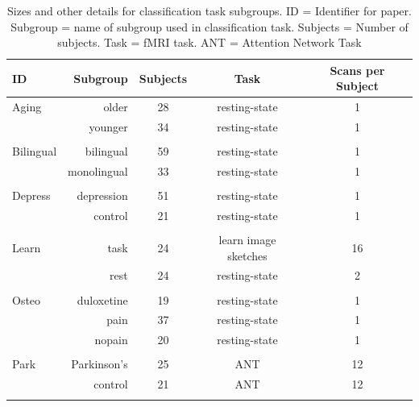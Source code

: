 \documentclass[12pt]{spieman}  %
\begin{document}
\begin{spacing}{2}
\begin{table}[h!]
\caption{
    \label{tab:data-subjects}
    Sizes and other details for classification task subgroups.
    ID = Identifier for paper. Subgroup = name of subgroup used in classification task. Subjects = Number of subjects.
    Task = fMRI task. ANT = Attention Network Task \cite{fanActivationAttentionalNetworks2005}
}
\small
\centering
\begin{tabular}{ l r c c c }
\hline
\textbf{ID}  & \textbf{Subgroup}  & \textbf{Subjects}  & \textbf{Task} & \textbf{Scans per Subject} \\
\hline
Aging   &  older             & 28      & resting-state        & 1 \\
        &  younger           & 34      & resting-state        & 1 \\
        &                    &         &                      &   \\
Bilingual  &  bilingual          & 59      & resting-state    & 1 \\
        &  monolingual        & 33      & resting-state       & 1 \\
        &                    &         &                      &   \\
Depress &  depression         & 51      & resting-state       & 1 \\
        &  control            & 21      & resting-state       & 1 \\
        &                    &         &                      &   \\
Learn   &  task              & 24      & learn image sketches & 16\\
        &  rest              & 24      & resting-state        & 2 \\
        &                    &         &                      &   \\
Osteo   &  duloxetine        & 19      & resting-state        & 1 \\
        &  pain              & 37      & resting-state        & 1 \\
        &  nopain            & 20      & resting-state        & 1 \\
        &                    &         &                      &   \\
Park    &  Parkinson's       & 25      & ANT                  & 12\\
        &  control           & 21      & ANT                  & 12\\
        &                    &         &                      &   \\

\end{tabular}
\end{table}
\end{spacing}
\end{document}
